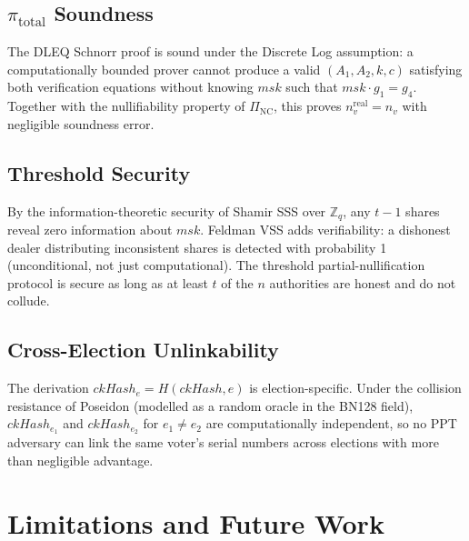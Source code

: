 \documentclass[conference]{IEEEtran}
\begin{document}
\subsection{$\pi_{\text{total}}$ Soundness}

The DLEQ Schnorr proof is sound under the Discrete Log assumption: a
computationally bounded prover cannot produce a valid $(A_1, A_2, k, c)$
satisfying both verification equations without knowing $\mathit{msk}$ such
that $\mathit{msk}\cdot g_1 = g_4$.  Together with the nullifiability
property of $\Pi_{\mathrm{NC}}$, this proves $n_v^{\text{real}} = n_v$
with negligible soundness error.

\subsection{Threshold Security}

By the information-theoretic security of Shamir SSS over $\mathbb{Z}_q$,
any $t-1$ shares reveal zero information about $\mathit{msk}$.  Feldman VSS
adds verifiability: a dishonest dealer distributing inconsistent shares is
detected with probability 1 (unconditional, not just computational).  The
threshold partial-nullification protocol is secure as long as at least
$t$ of the $n$ authorities are honest and do not collude.

\subsection{Cross-Election Unlinkability}

The derivation $\mathit{ckHash}_e = H(\mathit{ckHash}, e)$ is election-specific.
Under the collision resistance of Poseidon (modelled as a random oracle in
the BN128 field), $\mathit{ckHash}_{e_1}$ and $\mathit{ckHash}_{e_2}$ for
$e_1 \neq e_2$ are computationally independent, so no PPT adversary can
link the same voter's serial numbers across elections with more than negligible
advantage.

\section{Limitations and Future Work}
\label{sec:future}
\end{document}
